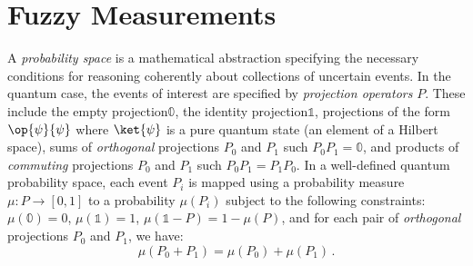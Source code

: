 \documentclass[english,reprint, aps, prl,superscriptaddress, showpacs,
showkeys, longbibliography, amsmath, amssymb]{revtex4-1}
\theoremstyle{plain}
\theoremstyle{definition}
\newcommand{\proj}[1]{\op{#1}{#1}}
\newcommand{\nb}{\nolinebreak[1] }
\begin{document}

\section{Fuzzy Measurements}
 \label{sec:fuzzy}
A \emph{probability space} is a mathematical abstraction specifying
the necessary conditions for reasoning coherently about collections of
uncertain events\nb\cite{Kolmogorov1950}. In the quantum case, the
events of interest are specified by \emph{projection operators}
$P$. These include the empty projection\nb$\mathbb{0}$, the identity
projection\nb$\mathbb{1}$, projections of the form $\proj{\psi}$ where
$\ket{\psi}$ is a pure quantum state (an element of a Hilbert space),
sums of \emph{orthogonal} projections $P_0$ and $P_1$ such
$P_0P_1=\mathbb{0}$, and products of \emph{commuting} projections
$P_0$ and $P_1$ such $P_0P_1=P_1P_0$. In a well-defined quantum
probability
space\nb\cite{10.2307/2308516,gleason1957,Redhead1987-REDINA,Maassen2010},
each event $P_{i}$ is mapped using a probability measure
$\mu : P \rightarrow [0,1]$ to a probability $\mu(P_{i})$ subject to
the following constraints: $\mu(\mathbb{0})=0$, $\mu(\mathbb{1})=1$,
$\mu\left(\mathbb{1}-P\right)=1-\mu\left(P\right)$, and for each pair
of \emph{orthogonal} projections $P_{0}$ and $P_{1}$, we have:
\begin{equation}
{\mu}\left(P_{0}+P_{1}\right)={\mu}\left(P_{0}\right)+{\mu}\left(P_{1}\right)\,.\label{eq:QuantumProbability-Addition}
\end{equation}
\end{document}
